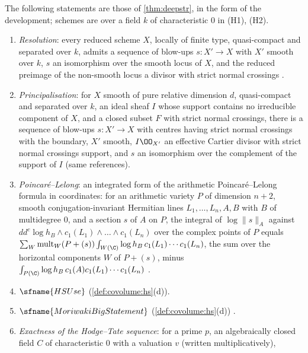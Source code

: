 \begin{hypothesis}\label{hyp:pf:deepstr:inputs}
The following statements are those of \cref{thm:deepstr}, in the form of the development; schemes are
over a field $k$ of characteristic $0$ in (H1), (H2).
\begin{enumerate}[label=(H\arabic*)]
\item\label{H:pf:deepstr:res} \emph{Resolution}: every reduced scheme $X$, locally of finite type,
quasi-compact and separated over $k$, admits a sequence of blow-ups $s\colon X'\to X$ with $X'$ smooth over
$k$, $s$ an isomorphism over the smooth locus of $X$, and the reduced preimage of the non-smooth locus a
divisor with strict normal crossings \cite{Hironaka1964,BierstoneMilman1997,Wlodarczyk2005,Kollar2007}.
\item\label{H:pf:deepstr:princ} \emph{Principalisation}: for $X$ smooth of pure relative dimension $d$,
quasi-compact and separated over $k$, an ideal sheaf $I$ whose support contains no irreducible component of
$X$, and a closed subset $F$ with strict normal crossings, there is a sequence of blow-ups $s\colon X'\to X$
with centres having strict normal crossings with the boundary, $X'$ smooth, $I\OO_{X'}$ an effective Cartier
divisor with strict normal crossings support, and $s$ an isomorphism over the complement of the support of
$I$ (same references).
\item\label{H:pf:deepstr:pl} \emph{Poincar\'e--Lelong}: an integrated form of the arithmetic
Poincar\'e--Lelong formula in coordinates: for an arithmetic variety $P$ of dimension $n+2$, smooth
conjugation-invariant Hermitian lines $L_1,\dots,L_n,A,B$ with $B$ of multidegree $0$, and a section $s$ of
$A$ on $P$, the integral of $\log\|s\|_A$ against $dd^c\log h_B\wedge c_1(L_1)\wedge\dots\wedge c_1(L_n)$ over
the complex points of $P$ equals $\sum_W\mathrm{mult}_W(P+(s))\int_{W(\C)}\log h_B\,c_1(L_1)\cdots c_1(L_n)$,
the sum over the horizontal components $W$ of $P+(s)$, minus $\int_{P(\C)}\log h_B\,c_1(A)c_1(L_1)\cdots c_1(L_n)$
\cite{GilletSoule1990,BostGilletSoule1994}.
\item\label{H:pf:deepstr:hs} $\sfname{HSUse}$ (\cref{def:covolume:hs}(d)).
\item\label{H:pf:deepstr:mor} $\sfname{MoriwakiBigStatement}$ (\cref{def:covolume:hs}(d)) \cite{Moriwaki2009,Yuan2008}.
\item\label{H:pf:deepstr:far} \emph{Exactness of the Hodge--Tate sequence}: for a prime $p$, an
algebraically closed field $C$ of characteristic $0$ with a valuation $v$ (written multiplicatively),

\end{enumerate}
\end{hypothesis}
